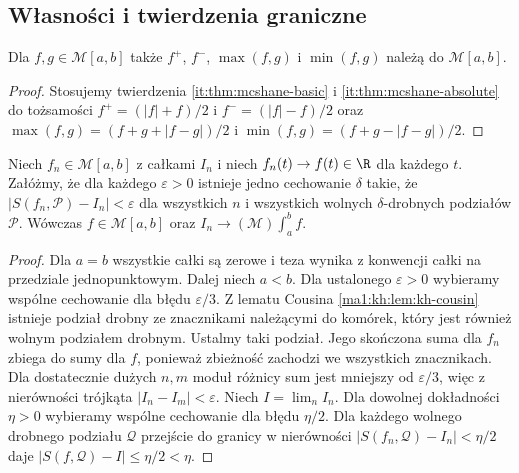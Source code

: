 \subsection{Własności i twierdzenia graniczne}
\begin{wniosek}\label{it:cor:mcshane-lattice}
Dla $f,g\in\mathcal M[a,b]$ także $f^+$, $f^-$,
$\max(f,g)$ i $\min(f,g)$ należą do $\mathcal M[a,b]$.
\end{wniosek}
\begin{proof}
Stosujemy twierdzenia \ref{it:thm:mcshane-basic}
i \ref{it:thm:mcshane-absolute} do tożsamości
$f^+=(|f|+f)/2$ i $f^-=(|f|-f)/2$
oraz $\max(f,g)=(f+g+|f-g|)/2$ i
$\min(f,g)=(f+g-|f-g|)/2$.
\end{proof}

\begin{twierdzenie}\label{it:thm:mcshane-equiintegrability}
Niech $f_n\in\mathcal M[a,b]$ z całkami $I_n$ i niech
$f_n(t)\to f(t)\in\R$ dla każdego $t$.
Załóżmy, że dla każdego $\varepsilon>0$ istnieje jedno
cechowanie $\delta$ takie, że $|S(f_n,\mathcal P)-I_n|<\varepsilon$
dla wszystkich $n$ i wszystkich wolnych $\delta$-drobnych
podziałów $\mathcal P$. Wówczas $f\in\mathcal M[a,b]$
oraz $I_n\to(\mathcal M)\int_a^b f$.
\end{twierdzenie}
\begin{proof}
Dla $a=b$ wszystkie całki są zerowe i teza wynika
z konwencji całki na przedziale jednopunktowym.
Dalej niech $a<b$.
Dla ustalonego $\varepsilon>0$ wybieramy wspólne cechowanie
dla błędu $\varepsilon/3$. Z lematu Cousina
\ref{ma1:kh:lem:kh-cousin} istnieje podział drobny
ze znacznikami należącymi do komórek, który jest
również wolnym podziałem drobnym.
Ustalmy taki podział. Jego skończona suma dla $f_n$ zbiega do sumy dla $f$,
ponieważ zbieżność zachodzi we wszystkich znacznikach.
Dla dostatecznie dużych $n,m$ moduł różnicy sum jest
mniejszy od $\varepsilon/3$, więc z nierówności trójkąta
$|I_n-I_m|<\varepsilon$. Niech $I=\lim_n I_n$.
Dla dowolnej dokładności $\eta>0$ wybieramy wspólne
cechowanie dla błędu $\eta/2$. Dla każdego wolnego
drobnego podziału $\mathcal Q$ przejście do granicy
w nierówności $|S(f_n,\mathcal Q)-I_n|<\eta/2$ daje
$|S(f,\mathcal Q)-I|\le\eta/2<\eta$.
\end{proof}

